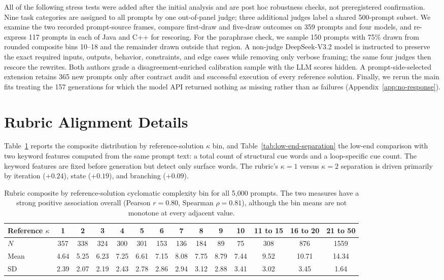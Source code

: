 \documentclass{article}
\begin{document}
All of the following stress tests were added after the initial analysis and are post hoc robustness checks, not preregistered confirmation. Nine task categories are assigned to all prompts by one out-of-panel judge; three additional judges label a shared 500-prompt subset. We examine the two recorded prompt-source frames, compare first-draw and five-draw outcomes on 359 prompts and four models, and re-express 117 prompts in each of Java and C++ for rescoring. For the paraphrase check, we sample 150 prompts with 75\% drawn from rounded composite bins 10--18 and the remainder drawn outside that region. A non-judge DeepSeek-V3.2 model is instructed to preserve the exact required inputs, outputs, behavior, constraints, and edge cases while removing only verbose framing; the same four judges then rescore the rewrites. Both authors grade a disagreement-enriched calibration sample with the LLM scores hidden. A prompt-side-selected extension retains 365 new prompts only after contract audit and successful execution of every reference solution. Finally, we rerun the main fits treating the 157 generations for which the model API returned nothing as missing rather than as failures (Appendix~\ref{app:no-response}).

\section{Rubric Alignment Details}
\label{app:alignment}

Table~\ref{tab:rubric-ref-cc} reports the composite distribution by reference-solution $\kappa$ bin, and Table~\ref{tab:low-end-separation} the low-end comparison with two keyword features computed from the same prompt text: a total count of structural cue words and a loop-specific cue count. The keyword features are fixed before generation but detect only surface words. The rubric's $\kappa=1$ versus $\kappa=2$ separation is driven primarily by iteration ($+0.24$), state ($+0.19$), and branching ($+0.09$).

\begin{table}[h]
\centering
\caption{Rubric composite by reference-solution cyclomatic complexity bin for all 5{,}000 prompts. The two measures have a strong positive association overall (Pearson $r=0.80$, Spearman $\rho=0.81$), although the bin means are not monotone at every adjacent value.}
\label{tab:rubric-ref-cc}
{\small
\setlength{\tabcolsep}{4pt}
\begin{tabular}{@{}lccccccccccccc@{}}
\toprule
Reference $\kappa$
& 1 & 2 & 3 & 4 & 5 & 6 & 7 & 8 & 9 & 10 & 11 to 15 & 16 to 20 & 21 to 50 \\
\midrule
$N$
& 357 & 338 & 324 & 300 & 301 & 153 & 136 & 184 & 89 & 75 & 308 & 876 & 1559 \\
Mean
& 4.64 & 5.25 & 6.23 & 7.25 & 6.61 & 7.15 & 8.08 & 7.75 & 8.79 & 7.44 & 9.52 & 10.71 & 14.34 \\
SD
& 2.39 & 2.07 & 2.19 & 2.43 & 2.78 & 2.86 & 2.94 & 3.12 & 2.88 & 3.41 & 3.02 & 3.45 & 1.64 \\
\bottomrule
\end{tabular}
}
\end{table}
\end{document}

